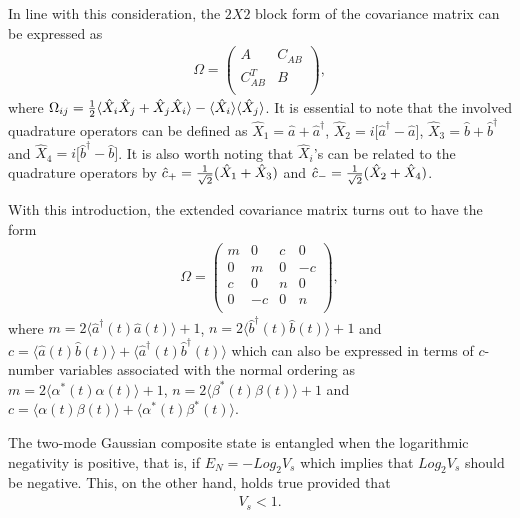 \documentclass[twocolumn,showpacs,preprintnumbers,amsmath,amssymb,pra]{revtex4}
\begin{document}
In line with this consideration, the $2X2$ block form of the covariance matrix  can be expressed  as
\begin{align}\label{s61}\Omega=\left(
                         \begin{array}{cc}
                           A & C_{AB} \\
                           C_{AB}^{T} & B \\
                         \end{array}
                       \right),
\end{align} where $\Omega_{ij}={1\over2}\langle\hat{X}_{i}\hat{X}_{j}+\hat{X}_{j}\hat{X}_{i}\rangle -\langle\hat{X}_{i}\rangle\langle\hat{X}_{j}\rangle$. It is essential to note that the involved quadrature operators can be defined as
$\hat{X}_{1}=\hat{a}+\hat{a}^{\dagger}$, $\hat{X}_{2}=i\big[\hat{a}^{\dagger}-\hat{a}\big]$,
$\hat{X}_{3}=\hat{b}+\hat{b}^{\dagger}$ and
$\hat{X}_{4}=i\big[\hat{b}^{\dagger}-\hat{b}\big]$. It is also worth noting that $\hat{X}_{i}$'s can be related to the quadrature operators by $\hat{c}_{+}={1\over\sqrt{2}}(\hat{X}_{1}+\hat{X}_{3})$ and $\hat{c}_{-}={1\over\sqrt{2}}(\hat{X}_{2}+\hat{X}_{4})$. 

With this introduction, the extended covariance matrix turns out to have the form
\begin{align}\label{s62}\Omega=\left(
                         \begin{array}{cccc}
                           m & 0 & c & 0 \\
                           0 & m & 0 & -c \\
                           c & 0 & n & 0 \\
                           0 & -c & 0 & n \\
                         \end{array}
                       \right),
\end{align} where $m=2\langle\hat{a}^{\dagger}(t)\hat{a}(t)\rangle +1$, $n=2\langle\hat{b}^{\dagger}(t)\hat{b}(t)\rangle +1$ and $c=\langle\hat{a}(t)\hat{b}(t)\rangle +\langle\hat{a}^{\dagger}(t)\hat{b}^{\dagger}(t)\rangle$ which can also be expressed in terms of $c$-number variables associated with the normal ordering as
$m=2\langle\alpha^{*}(t)\alpha(t)\rangle +1$,
$n=2\langle\beta^{*}(t)\beta(t)\rangle +1$ and
$c=\langle\alpha(t)\beta(t)\rangle +\langle\alpha^{*}(t)\beta^{*}(t)\rangle$.

The two-mode Gaussian composite state is entangled when the logarithmic negativity is positive, that is, if $E_{N}=-Log_{2}V_{s}$ which implies that $Log_{2}V_{s}$ should be negative. This, on the other hand, holds true provided \cite{prl93063601} that
\begin{align}\label{s63}V_{s}<1.\end{align}
\end{document}
